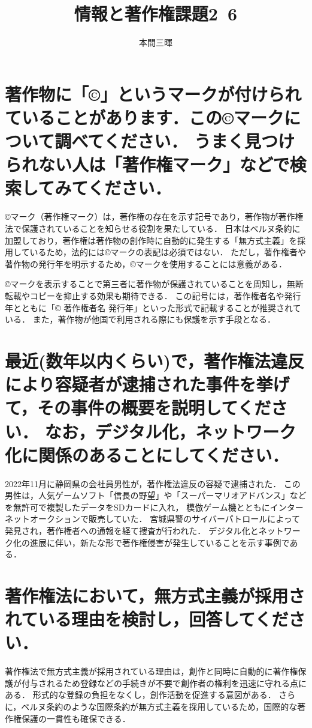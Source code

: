 \documentclass[titlepage,a4paper]{jsarticle}
\title{情報と著作権課題2~6}
\author{本間三暉}
\begin{document}
\maketitle
\section{著作物に「©」というマークが付けられていることがあります．この©マークについて調べてください．
  うまく見つけられない人は「著作権マーク」などで検索してみてください．}
©マーク（著作権マーク）は，著作権の存在を示す記号であり，著作物が著作権法で保護されていることを知らせる役割を果たしている．
日本はベルヌ条約に加盟しており，著作権は著作物の創作時に自動的に発生する「無方式主義」を採用しているため，法的には©マークの表記は必須ではない．
ただし，著作権者や著作物の発行年を明示するため，©マークを使用することには意義がある\cite{utility}\cite{authense}．

©マークを表示することで第三者に著作物が保護されていることを周知し，無断転載やコピーを抑止する効果も期待できる\cite{ameni}．
この記号には，著作権者名や発行年とともに「© 著作権者名 発行年」といった形式で記載することが推奨されている\cite{canvas}．
また，著作物が他国で利用される際にも保護を示す手段となる\cite{tarunk}．
\section{最近(数年以内くらい)で，著作権法違反により容疑者が逮捕された事件を挙げて，その事件の概要を説明してください．
  なお，デジタル化，ネットワーク化に関係のあることにしてください．}
2022年11月に静岡県の会社員男性が，著作権法違反の容疑で逮捕された\cite{ACCS}．
この男性は，人気ゲームソフト「信長の野望」や「スーパーマリオアドバンス」などを無許可で複製したデータをSDカードに入れ，
模倣ゲーム機とともにインターネットオークションで販売していた．
宮城県警のサイバーパトロールによって発見され，著作権者への通報を経て捜査が行われた．
デジタル化とネットワーク化の進展に伴い，新たな形で著作権侵害が発生していることを示す事例である．
\section{著作権法において，無方式主義が採用されている理由を検討し，回答してください．}
著作権法で無方式主義が採用されている理由は，創作と同時に自動的に著作権保護が付与されるため登録などの手続きが不要で創作者の権利を迅速に守れる点にある．
形式的な登録の負担をなくし，創作活動を促進する意図がある．
さらに，ベルヌ条約のような国際条約が無方式主義を採用しているため，国際的な著作権保護の一貫性も確保できる．
\end{document}
